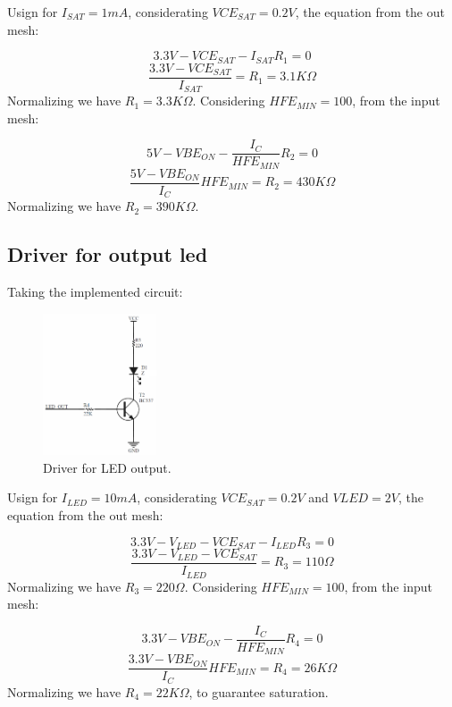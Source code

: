 Usign for $I_{SAT} = 1mA$, considerating $VCE_{SAT} = 0.2V$, 
the equation from the out mesh:

$$3.3V - VCE_{SAT} - I_{SAT}R_1 = 0$$
$$\frac{3.3V - VCE_{SAT}}{I_{SAT}} = R_1 = 3.1K\Omega$$
Normalizing we have $R_1 = 3.3K\Omega$.
Considering $HFE_{MIN} = 100$, from the input mesh:

$$5V - VBE_{ON} - \frac{I_C}{HFE_{MIN}}R_2 = 0$$
$$\frac{5V - VBE_{ON}}{I_C}HFE_{MIN} = R_2 = 430K\Omega$$
Normalizing we have $R_2 = 390K\Omega$.

\subsection*{Driver for output led}
Taking the implemented circuit:

\begin{figure}[H]
    \begin{centering}
    \includegraphics[width=0.3\textwidth]{Graficos3/LED_Driver.png}
    \par\end{centering}
    \caption{Driver for LED output.}
\end{figure}

Usign for $I_{LED} = 10mA$, considerating $VCE_{SAT} = 0.2V$ 
and $V{LED} = 2V$, the equation from the out mesh:

$$3.3V - V_{LED} - VCE_{SAT} - I_{LED}R_3 = 0$$
$$\frac{3.3V - V_{LED} - VCE_{SAT}}{I_{LED}} = R_3 = 110\Omega$$
Normalizing we have $R_3 = 220\Omega$.
Considering $HFE_{MIN} = 100$, from the input mesh:

$$3.3V - VBE_{ON} - \frac{I_C}{HFE_{MIN}}R_4 = 0$$
$$\frac{3.3V - VBE_{ON}}{I_C}HFE_{MIN} = R_4 = 26K\Omega$$
Normalizing we have $R_4 = 22K\Omega$, to guarantee saturation.

